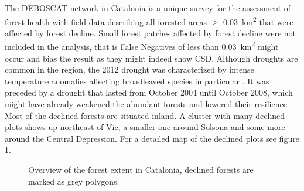 The DEBOSCAT network in Catalonia is a unique survey for the assessment of forest health with field data describing all forested areas $>$ 0.03~km\textsuperscript{2} that were affected by forest decline. Small forest patches affected by forest decline were not included in the analysis, that is False Negatives of less than 0.03~km\textsuperscript{2} might occur and bias the result as they might indeed show CSD. Although droughts are common in the region, the 2012 drought was characterized by intense temperature anomalies affecting broadleaved species in particular \citep{chaparro2017}. It was preceded by a drought that lasted from October 2004 until October 2008, which might have already weakened the abundant forests and lowered their resilience. Most of the declined forests are situated inland. A cluster with many declined plots shows up northeast of Vic, a smaller one around Solsona and some more around the Central Depression. For a detailed map of the declined plots see figure \ref{studarea}.


\begin{figure}[H]
	\centering
	\caption{Overview of the forest extent in Catalonia, declined forests are marked as grey polygons.}\label{studarea}
\end{figure}

